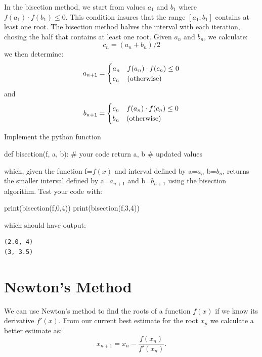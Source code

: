 In the bisection method, we start from values $a_1$ and $b_1$ where
$f(a_1) \cdot f(b_1) \leq 0$.  This condition insures that the range
$[a_1, b_1]$ contains at least one root.  The bisection method halves
the interval with each iteration, chosing the half that contains at
least one root.  Given $a_n$ and $b_n$, we calculate:
\begin{displaymath}
c_n = (a_n + b_n)/2
\end{displaymath}
we then determine:
\begin{displaymath}
a_{n+1}=
\begin{cases}
a_n & f(a_n) \cdot f(c_n) \leq 0 \\
c_n & \rm (otherwise) \\
\end{cases}
\end{displaymath}
and
\begin{displaymath}
b_{n+1}=
\begin{cases}
c_n & f(a_n) \cdot f(c_n) \leq 0\\
b_n & \rm (otherwise) \\
\end{cases}
\end{displaymath}

\plot Implement the python function
\begin{python}
def bisection(f, a, b):
   # your code  
   return a, b # updated values
\end{python}
which, given the function f=$f(x)$ and interval defined by a=$a_n$
b=$b_n$, returns the smaller interval defined by a=$a_{n+1}$ and
b=$b_{n+1}$ using the bisection algorithm.  Test your code with:
\begin{python}
print(bisection(f,0,4))
print(bisection(f,3,4))
\end{python}
which should have output:
\begin{verbatim}
(2.0, 4)
(3, 3.5)
\end{verbatim}

\section{Newton's Method}

We can use Newton's method to find the roots of a function $f(x)$ if we know its derivative $f'(x)$.
From our current best estimate for the root $x_n$ we calculate a better estimate as:
\begin{displaymath}
x_{n+1} = x_n - \frac{f(x_n)}{f'(x_n)}.
\end{displaymath}


